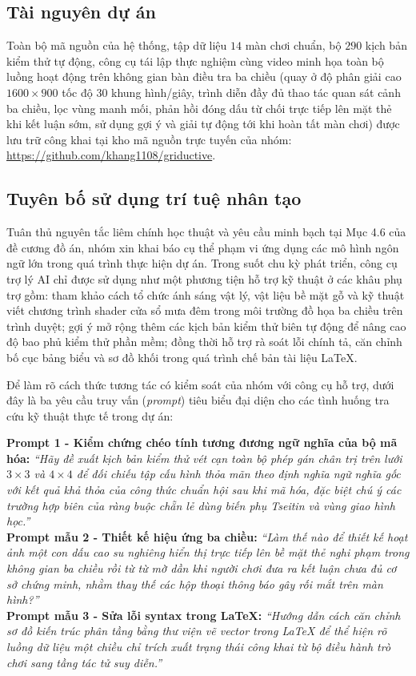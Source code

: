 \subsection{Tài nguyên dự án}
Toàn bộ mã nguồn của hệ thống, tập dữ liệu $14$ màn chơi chuẩn, bộ $290$ kịch bản
kiểm thử tự động, công cụ tái lập thực nghiệm cùng video minh họa toàn bộ luồng
hoạt động trên không gian bàn điều tra ba chiều (quay ở độ phân giải cao
$1600 \times 900$ tốc độ $30$ khung hình/giây, trình diễn đầy đủ thao tác quan sát
cảnh ba chiều, lọc vùng manh mối, phản hồi đóng dấu từ chối trực tiếp lên mặt thẻ
khi kết luận sớm, sử dụng gợi ý và giải tự động tới khi hoàn tất màn chơi) được
lưu trữ công khai tại kho mã nguồn trực tuyến của nhóm:
\url{https://github.com/khang1108/griductive}.

\subsection{Tuyên bố sử dụng trí tuệ nhân tạo}
\label{subsec:ai_appendix}
Tuân thủ nguyên tắc liêm chính học thuật và yêu cầu minh bạch tại Mục 4.6 của đề
cương đồ án, nhóm xin khai báo cụ thể phạm vi ứng dụng các mô hình ngôn ngữ lớn
trong quá trình thực hiện dự án. Trong suốt chu kỳ phát triển, công cụ trợ lý AI
chỉ được sử dụng như một phương tiện hỗ trợ kỹ thuật ở các khâu phụ trợ gồm: tham
khảo cách tổ chức ánh sáng vật lý, vật liệu bề mặt gỗ và kỹ thuật viết chương trình
shader cửa sổ mưa đêm trong môi trường đồ họa ba chiều trên trình duyệt; gợi ý mở
rộng thêm các kịch bản kiểm thử biên tự động để nâng cao độ bao phủ kiểm thử phần
mềm; đồng thời hỗ trợ rà soát lỗi chính tả, căn chỉnh bố cục bảng biểu và sơ đồ
khối trong quá trình chế bản tài liệu \LaTeX.

Để làm rõ cách thức tương tác có kiểm soát của nhóm với công cụ hỗ trợ, dưới đây
là ba yêu cầu truy vấn (\textit{prompt}) tiêu biểu đại diện cho các tình huống tra
cứu kỹ thuật thực tế trong dự án:
\begin{softbox}
\textbf{Prompt 1 - Kiểm chứng chéo tính tương đương ngữ nghĩa của bộ mã hóa:}
\textit{``Hãy đề xuất kịch bản kiểm thử vét cạn toàn bộ phép gán chân trị trên lưới
$3 \times 3$ và $4 \times 4$ để đối chiếu tập cấu hình thỏa mãn theo định nghĩa ngữ
nghĩa gốc với kết quả khả thỏa của công thức chuẩn hội sau khi mã hóa, đặc biệt chú
ý các trường hợp biên của ràng buộc chẵn lẻ dùng biến phụ Tseitin và vùng giao hình
học.''}\\[6pt]
\textbf{Prompt mẫu 2 - Thiết kế hiệu ứng ba chiều:}
\textit{``Làm thế nào để thiết kế hoạt ảnh một con dấu cao su nghiêng hiển thị
trực tiếp lên bề mặt thẻ nghi phạm trong không gian ba chiều rồi từ từ mờ dần khi
người chơi đưa ra kết luận chưa đủ cơ sở chứng minh, nhằm thay thế các hộp thoại
thông báo gây rối mắt trên màn hình?''}\\[6pt]
\textbf{Prompt mẫu 3 - Sửa lỗi syntax trong \LaTeX:} \textit{``Hướng dẫn cách
căn chỉnh sơ đồ kiến trúc phân tầng bằng thư viện vẽ vector trong \LaTeX{} để thể
hiện rõ luồng dữ liệu một chiều chỉ trích xuất trạng thái công khai từ bộ điều hành
trò chơi sang tầng tác tử suy diễn.''}
\end{softbox}

